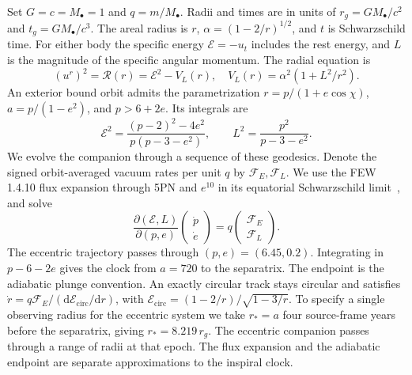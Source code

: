 \documentclass[aps,prd,reprint,amsmath,amssymb,nofootinbib]{revtex4-2}
\newcommand{\E}{\mathcal E}
\newcommand{\dd}{\mathrm{d}}
\newcommand{\circsub}{\mathrm{circ}}
\begin{document}
Set $G=c=M_\bullet=1$ and $q=m/M_\bullet$. Radii and times are in units of $r_g=GM_\bullet/c^2$ and $t_g=GM_\bullet/c^3$. The areal radius is $r$, $\alpha=(1-2/r)^{1/2}$, and $t$ is Schwarzschild time. For either body the specific energy $\E=-u_t$ includes the rest energy, and $L$ is the magnitude of the specific angular momentum. The radial equation is
\begin{equation}
 (u^r)^2=\mathcal R(r)=\E^2-V_L(r),\quad
 V_L(r)=\alpha^2(1+L^2/r^2).
 \label{radial}
\end{equation}
An exterior bound orbit admits the parametrization $r=p/(1+e\cos\chi)$, $a=p/(1-e^2)$, and $p>6+2e$. Its integrals are
\begin{equation}
 \E^2=\frac{(p-2)^2-4e^2}{p(p-3-e^2)},\qquad
 L^2=\frac{p^2}{p-3-e^2}.
 \label{elements}
\end{equation}
We evolve the companion through a sequence of these geodesics. Denote the signed orbit-averaged vacuum rates per unit $q$ by $\mathcal F_E,\mathcal F_L$. We use the FEW 1.4.10 flux expansion through 5PN and $e^{10}$ in its equatorial Schwarzschild limit~\cite{Fujita,Katz}, and solve
\begin{equation}
 \frac{\partial(\E,L)}{\partial(p,e)}
 \begin{pmatrix}\dot p\\ \dot e\end{pmatrix}
 =q\begin{pmatrix}\mathcal F_E\\ \mathcal F_L\end{pmatrix}.
 \label{clock}
\end{equation}
The eccentric trajectory passes through $(p,e)=(6.45,0.2)$. Integrating in $p-6-2e$ gives the clock from $a=720$ to the separatrix. The endpoint is the adiabatic plunge convention. An exactly circular track stays circular and satisfies $\dot r=q\mathcal F_E/(\dd\E_{\circsub}/\dd r)$, with $\E_{\circsub}=(1-2/r)/\sqrt{1-3/r}$. To specify a single observing radius for the eccentric system we take $r_*=a$ four source-frame years before the separatrix, giving $r_*=8.219\,r_g$. The eccentric companion passes through a range of radii at that epoch. The flux expansion and the adiabatic endpoint are separate approximations to the inspiral clock.
\end{document}
